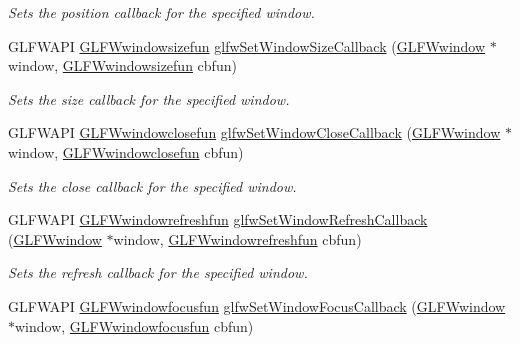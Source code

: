 \begin{DoxyCompactItemize}
\begin{DoxyCompactList}\small\item\em Sets the position callback for the specified window. \end{DoxyCompactList}\item 
G\+L\+F\+W\+A\+P\+I \hyperlink{group__window_gae49ee6ebc03fa2da024b89943a331355}{G\+L\+F\+Wwindowsizefun} \hyperlink{group__window_ga150dad5f364425916c5816074cffa5e7}{glfw\+Set\+Window\+Size\+Callback} (\hyperlink{group__window_ga3c96d80d363e67d13a41b5d1821f3242}{G\+L\+F\+Wwindow} $\ast$window, \hyperlink{group__window_gae49ee6ebc03fa2da024b89943a331355}{G\+L\+F\+Wwindowsizefun} cbfun)
\begin{DoxyCompactList}\small\item\em Sets the size callback for the specified window. \end{DoxyCompactList}\item 
G\+L\+F\+W\+A\+P\+I \hyperlink{group__window_ga93e7c2555bd837f4ed8b20f76cada72e}{G\+L\+F\+Wwindowclosefun} \hyperlink{group__window_ga5b827da350141c789acd64f5c4f7a0e1}{glfw\+Set\+Window\+Close\+Callback} (\hyperlink{group__window_ga3c96d80d363e67d13a41b5d1821f3242}{G\+L\+F\+Wwindow} $\ast$window, \hyperlink{group__window_ga93e7c2555bd837f4ed8b20f76cada72e}{G\+L\+F\+Wwindowclosefun} cbfun)
\begin{DoxyCompactList}\small\item\em Sets the close callback for the specified window. \end{DoxyCompactList}\item 
G\+L\+F\+W\+A\+P\+I \hyperlink{group__window_ga7a56f9e0227e2cd9470d80d919032e08}{G\+L\+F\+Wwindowrefreshfun} \hyperlink{group__window_ga9d2621fbc271a0cdc0ce91f9749f46e3}{glfw\+Set\+Window\+Refresh\+Callback} (\hyperlink{group__window_ga3c96d80d363e67d13a41b5d1821f3242}{G\+L\+F\+Wwindow} $\ast$window, \hyperlink{group__window_ga7a56f9e0227e2cd9470d80d919032e08}{G\+L\+F\+Wwindowrefreshfun} cbfun)
\begin{DoxyCompactList}\small\item\em Sets the refresh callback for the specified window. \end{DoxyCompactList}\item 
G\+L\+F\+W\+A\+P\+I \hyperlink{group__window_ga58be2061828dd35080bb438405d3a7e2}{G\+L\+F\+Wwindowfocusfun} \hyperlink{group__window_gac89c6534ba7fbab6f6c68b855656c0d4}{glfw\+Set\+Window\+Focus\+Callback} (\hyperlink{group__window_ga3c96d80d363e67d13a41b5d1821f3242}{G\+L\+F\+Wwindow} $\ast$window, \hyperlink{group__window_ga58be2061828dd35080bb438405d3a7e2}{G\+L\+F\+Wwindowfocusfun} cbfun)

\end{DoxyCompactItemize}
